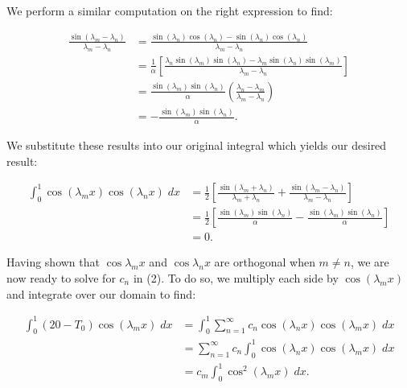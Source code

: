 \begin{solution}
    We perform a similar computation on the right expression to find:

    \begin{align*}
        \frac{\sin{(\lambda_m - \lambda_n)}}{\lambda_m - \lambda_n}
        &= \frac{\sin{(\lambda_n)} \cos{(\lambda_n) - \sin{(\lambda_n)}} \cos{(\lambda_n)}}{\lambda_m - \lambda_n} \\
        &= \frac{1}{\alpha} \left[ \frac{\lambda_n \sin{(\lambda_m)} \sin{(\lambda_n) - \lambda_m} \sin{(\lambda_n)} \sin{(\lambda_m)}}{\lambda_m - \lambda_n} \right] \\
        &= \frac{\sin{(\lambda_m)} \sin{(\lambda_n)}}{\alpha} \left( \frac{\lambda_n - \lambda_m}{\lambda_m - \lambda_n} \right) \\
        &= -\frac{\sin{(\lambda_m)} \sin{(\lambda_n)}}{\alpha}.
    \end{align*}


    \pagebreak
    We substitute these results into our original integral which yields our desired result:

    \begin{align*}
        \int_{0}^{1}{\cos{(\lambda_m x)}\cos{(\lambda_n x)}\; dx} &= \frac{1}{2} \left[ \frac{\sin{(\lambda_m + \lambda_n)}}{\lambda_m + \lambda_n} + \frac{\sin{(\lambda_m - \lambda_n)}}{\lambda_m - \lambda_n} \right] \\
                                                                  &= \frac{1}{2} \left[ \frac{\sin{(\lambda_m)} \sin{(\lambda_n)}}{\alpha} - \frac{\sin{(\lambda_m)} \sin{(\lambda_n)}}{\alpha} \right] \\
                                                                  &= 0.
    \end{align*}
    
    Having shown that $\cos{\lambda_m x}$ and $\cos{\lambda_n x}$ are orthogonal when $m \neq n$, we are now ready to solve for $c_n$ in (2).
    To do so, we multiply each side by $\cos{(\lambda_m x)}$ and integrate over our domain to find:

    \begin{align*}
        \int_{0}^{1}{(20 - T_0) \cos{(\lambda_m x)}\; dx} &= \int_{0}^{1}{\sum_{n=1}^{\infty}{c_n \cos{(\lambda_n x)}} \cos{(\lambda_m x)}\; dx} \\
                                                          &= \sum_{n=1}^{\infty}{c_n  \int_{0}^{1}{\cos{(\lambda_n x)} \cos{(\lambda_m x)}\; dx} } \\
                                                          &= c_m \int_{0}^{1}{\cos^2{(\lambda_m x)}\; dx}.
    \end{align*}


\end{solution}
